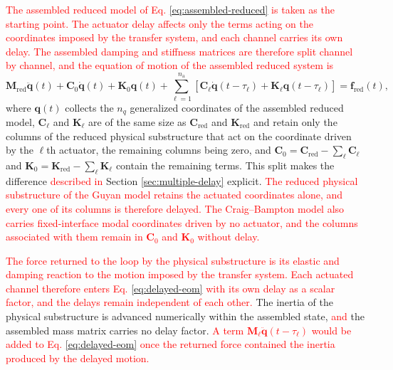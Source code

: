 \documentclass[11pt,a4paper]{article}
\numberwithin{equation}{section}
\newcommand{\rev}[1]{\textcolor{red}{#1}}
\begin{document}
\rev{The assembled reduced model of Eq. \eqref{eq:assembled-reduced} is taken as the starting point. The actuator delay affects only the terms acting on the coordinates imposed by the transfer system, and each channel carries its own delay. The assembled damping and stiffness matrices are therefore split channel by channel, and the equation of motion of the assembled reduced system is}
\begin{equation}
	\mathbf{M}_{\mathrm{red}}\ddot{\bm{q}}(t)+\mathbf{C}_{0}\dot{\bm{q}}(t)+\mathbf{K}_{0}\bm{q}(t)
	+\sum_{\ell=1}^{n_{\mathrm{a}}}
	\left[
	\mathbf{C}_{\ell}\dot{\bm{q}}(t-\tau_{\ell})
	+\mathbf{K}_{\ell}\bm{q}(t-\tau_{\ell})
	\right]
	=\bm{f}_{\mathrm{red}}(t),
	\label{eq:delayed-eom}
\end{equation}
where \(\bm{q}(t)\) collects the \(n_{q}\) generalized coordinates of the assembled reduced model, \(\mathbf{C}_{\ell}\) and \(\mathbf{K}_{\ell}\) are of the same size as \(\mathbf{C}_{\mathrm{red}}\) and \(\mathbf{K}_{\mathrm{red}}\) and retain only the columns of the reduced physical substructure that act on the coordinate driven by the \(\ell\)th actuator, the remaining columns being zero, and \(\mathbf{C}_{0}=\mathbf{C}_{\mathrm{red}}-\sum_{\ell}\mathbf{C}_{\ell}\) and \(\mathbf{K}_{0}=\mathbf{K}_{\mathrm{red}}-\sum_{\ell}\mathbf{K}_{\ell}\) contain the remaining terms. This split makes the difference \rev{described in} Section \ref{sec:multiple-delay} explicit. \rev{The reduced physical substructure of the Guyan model retains the actuated coordinates alone, and every one of its columns is therefore delayed. The Craig--Bampton model also carries fixed-interface modal coordinates driven by no actuator, and the columns associated with them remain in \(\mathbf{C}_{0}\) and \(\mathbf{K}_{0}\) without delay.}

\rev{The force returned to the loop by the physical substructure is its elastic and damping reaction to the motion imposed by the transfer system. Each actuated channel therefore enters Eq. \eqref{eq:delayed-eom} with its own delay as a scalar factor, and the delays remain independent of each other.} The inertia of the physical substructure is advanced numerically within the assembled state, \rev{and} the assembled mass matrix carries no delay factor. \rev{A term \(\mathbf{M}_{\ell}\ddot{\bm{q}}(t-\tau_{\ell})\) would be added to Eq. \eqref{eq:delayed-eom} once the returned force contained the inertia produced by the delayed motion.}
\end{document}
